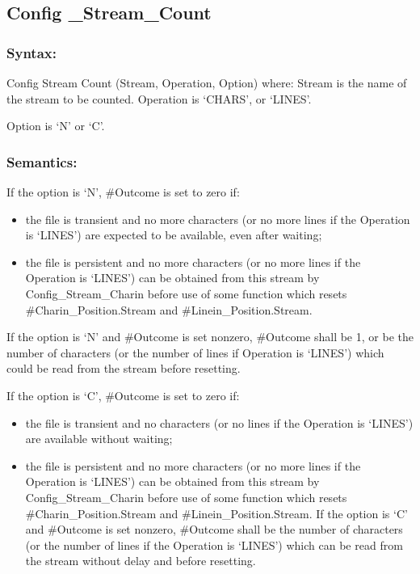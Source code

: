 \subsection{Config \_Stream\_Count}\label{config-_stream_count}

\subsubsection{Syntax:}\label{syntax-32}

Config Stream Count (Stream, Operation, Option) where: Stream is the
name of the stream to be counted. Operation is `CHARS', or `LINES'.

Option is `N' or `C'.

\subsubsection{Semantics:}\label{semantics-33}

If the option is `N', \#Outcome is set to zero if:

\begin{itemize}
\item
  the file is transient and no more characters (or no more lines if the
  Operation is `LINES') are expected to be available, even after
  waiting;
\item
  the file is persistent and no more characters (or no more lines if the
  Operation is `LINES') can be obtained from this stream by
  Config\_Stream\_Charin before use of some function which resets
  \#Charin\_Position.Stream and \#Linein\_Position.Stream.
\end{itemize}

If the option is `N' and \#Outcome is set nonzero, \#Outcome shall be 1,
or be the number of characters (or the number of lines if Operation is
`LINES') which could be read from the stream before resetting.

If the option is `C', \#Outcome is set to zero if:

\begin{itemize}
\item
  the file is transient and no characters (or no lines if the Operation
  is `LINES') are available without waiting;
\item
  the file is persistent and no more characters (or no more lines if the
  Operation is `LINES') can be obtained from this stream by
  Config\_Stream\_Charin before use of some function which resets
  \#Charin\_Position.Stream and \#Linein\_Position.Stream. If the option
  is `C' and \#Outcome is set nonzero, \#Outcome shall be the number of
  characters (or the number of lines if the Operation is `LINES') which
  can be read from the stream without delay and before resetting.
\end{itemize}

